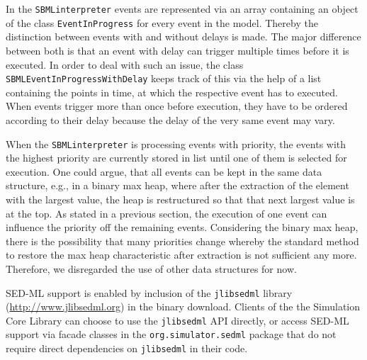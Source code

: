 \documentclass[10pt]{bmc_article}
\newenvironment{bmcformat}{\baselineskip20pt\sloppy\setboolean{publ}{false}}{\baselineskip20pt\sloppy}
\newcommand{\SBMLinterpreter}{\texttt{SBML\-interpreter}}
\newcommand{\jlibsedml}{\texttt{jlibsedml}}
\newcommand{\EventInProgress}{\texttt{Event\-In\-Progress}}
\newcommand{\SBMLEventInProgressWithDelay}{\texttt{SBML\-Event\-In\-Progress\-With\-Delay}}
\begin{document}
\begin{bmcformat}
In the \SBMLinterpreter{} events are represented via an array containing an object of the class \EventInProgress{} for every event in the model.
Thereby the distinction between events with and without delays is made.
The major difference between both is that an event with delay can trigger multiple times before it is executed.
In order to deal with such an issue, the class \SBMLEventInProgressWithDelay{} keeps track of this via the help of a list containing the points in time, at which the respective event has to executed.
When events trigger more than once before execution, they have to be ordered according to their delay because the delay of the very same event may vary.

When the \SBMLinterpreter{} is processing events with priority, the events with the highest priority 
are currently stored in list until one of them is selected for execution. One could argue, that all events can
be kept in the same data structure, e.g., in a binary max heap, where after the extraction of the element with the largest value, the heap is restructured so that that next largest value is at the top.
As stated in a previous section, the execution of one event can influence the priority off the remaining events.
Considering the binary max heap, there is the possibility that many priorities change whereby the standard
method to restore the max heap characteristic after extraction is not sufficient any more.
Therefore, we disregarded the use of other data structures for now.
%

%
SED-ML support is enabled by inclusion of the \jlibsedml{} library
(\href{http://www.jlibsedml.org}{http://www.jlibsedml.org}) in the binary
download. Clients of the the Simulation Core Library can choose to use the
\jlibsedml{} API directly, or access SED-ML support via  facade classes
in the \texttt{org.simulator.sedml} package that do not require direct
dependencies on \jlibsedml{} in their code.



\end{bmcformat}
\end{document}

